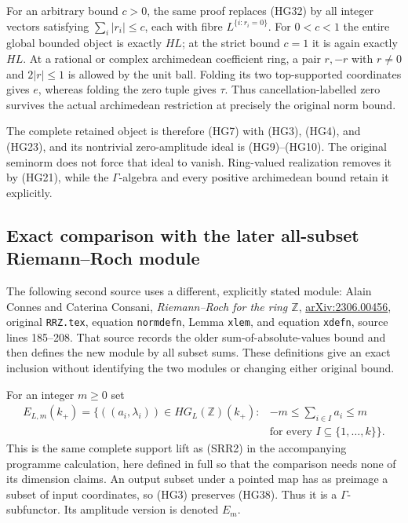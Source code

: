 For an arbitrary bound $c>0$, the same proof replaces (HG32)
by all integer vectors satisfying $\sum_i|r_i|\le c$, each
with fibre $L^{\{i:r_i=0\}}$.  For $0<c<1$ the entire global
bounded object is exactly $HL$; at the strict bound $c=1$ it
is again exactly $HL$.  At a rational or complex archimedean
coefficient ring, a pair $r,-r$ with $r\ne0$ and $2|r|\le1$
is allowed by the unit ball.  Folding its two top-supported
coordinates gives $e$, whereas folding the zero tuple gives
$\tau$.  Thus cancellation-labelled zero survives the actual
archimedean restriction at precisely the original norm bound.

The complete retained object is therefore (HG7) with (HG3),
(HG4), and (HG23), and its nontrivial zero-amplitude ideal is
(HG9)--(HG10).  The original seminorm does not force that ideal
to vanish.  Ring-valued realization removes it by (HG21),
while the $\Gamma$-algebra and every positive archimedean bound
retain it explicitly.

\subsection{Exact comparison with the later all-subset Riemann--Roch module}

The following second source uses a different, explicitly stated
module: Alain Connes and Caterina Consani,
\emph{Riemann--Roch for the ring $\mathbb Z$},
\href{https://arxiv.org/abs/2306.00456}{arXiv:2306.00456},
original \texttt{RRZ.tex}, equation \texttt{normdefn},
Lemma \texttt{xlem}, and equation \texttt{xdefn}, source
lines 185--208.  That source records the older sum-of-absolute-values
bound and then defines the new module by all subset sums.
These definitions give an exact inclusion without identifying
the two modules or changing either original bound.

For an integer $m\ge0$ set
\begin{equation}\tag{HG38}
 \begin{aligned}
 E_{L,m}(k_+)=\{((a_i,\lambda_i))\in HG_L(\mathbb Z)(k_+):
     &-m\le\sum_{i\in I}a_i\le m\\
     &\text{for every }I\subseteq\{1,\ldots,k\}\}.
 \end{aligned}
\end{equation}
This is the same complete support lift as (SRR2) in the
accompanying programme calculation, here defined in full so
that the comparison needs none of its dimension claims.
An output subset under a pointed map has as preimage a subset
of input coordinates, so (HG3) preserves (HG38).  Thus it
is a $\Gamma$-subfunctor.  Its amplitude version is denoted
$E_m$.

